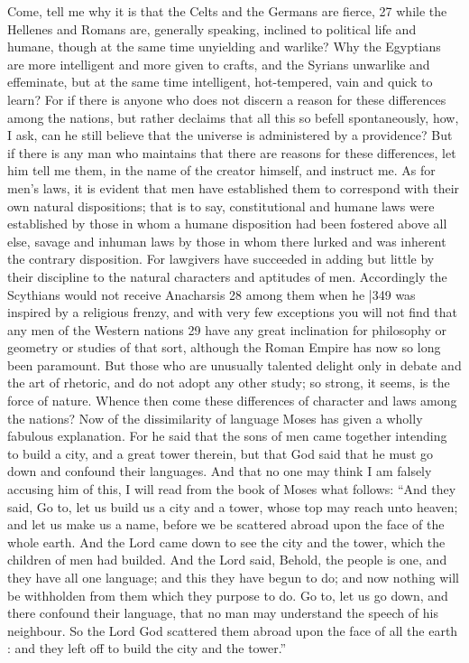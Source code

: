 Come, tell me why it is that the Celts and the Germans are fierce, 27 while the Hellenes and Romans are, generally speaking, inclined to political life and humane, though at the same time unyielding and warlike? Why the Egyptians are more intelligent and more given to crafts, and the Syrians unwarlike and effeminate, but at the same time intelligent, hot-tempered, vain and quick to learn? For if there is anyone who does not discern a reason for these differences among the nations, but rather declaims that all this so befell spontaneously, how, I ask, can he still believe that the universe is administered by a providence? But if there is any man who maintains that there are reasons for these differences, let him tell me them, in the name of the creator himself, and instruct me. As for men's laws, it is evident that men have established them to correspond with their own natural dispositions; that is to say, constitutional and humane laws were established by those in whom a humane disposition had been fostered above all else, savage and inhuman laws by those in whom there lurked and was inherent the contrary disposition. For lawgivers have succeeded in adding but little by their discipline to the natural characters and aptitudes of men. Accordingly the Scythians would not receive Anacharsis
28 among them when he |349
was inspired by a religious frenzy, and with very few exceptions you will not find that any men of the Western nations
29 have any great inclination for philosophy or geometry or studies of that sort, although the Roman Empire has now so long been paramount. But those who are unusually talented delight only in debate and the art of rhetoric, and do not adopt any other study; so strong, it seems, is the force of nature. Whence then come these differences of character and laws among the nations? Now of the dissimilarity of language Moses has given a wholly fabulous explanation. For he said that the sons of men came together intending to build a city, and a great tower therein, but that God said that he must go down and confound their languages. And that no one may think I am falsely accusing him of this, I will read from the book of Moses what follows: ``And they said, Go to, let us build us a city and a tower, whose top may reach unto heaven; and let us make us a name, before we be scattered abroad upon the face of the whole earth. And the Lord came down to see the city and the tower, which the children of men had builded. And the Lord said, Behold, the people is one, and they have all one language; and this they have begun to do; and now nothing will be withholden from them which they purpose to do. Go to, let us go down, and there confound their language, that no man may understand the speech of his neighbour. So the Lord God scattered them abroad upon the face of all the earth : and they left off to build the city and the tower.''

